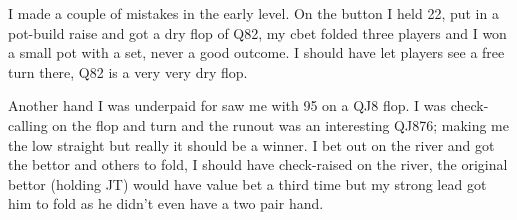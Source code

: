 I made a couple of mistakes in the early level. On the button I held
22, put in a pot-build raise and got a dry flop of Q82, my cbet
folded three players and I won a small pot with a set, never a
good outcome. I should have let players see a free turn there, Q82
is a very very dry flop.

Another hand I was underpaid for saw me with 95 on a QJ8 flop. I was
check-calling on the flop and turn and the runout was an interesting
QJ876; making me the low straight but really it should be a winner.
I bet out on the river and got the bettor and others to fold, I should
have check-raised on the river, the original bettor (holding JT)
would have value bet a third time but my strong lead got him to fold
as he didn't even have a two pair hand.

